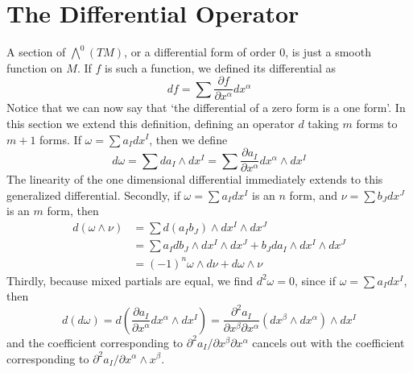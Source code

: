 \section{The Differential Operator}

A section of $\bigwedge^0(TM)$, or a differential form of order 0, is just a smooth function on $M$. If $f$ is such a function, we defined its differential as
%
\[ df = \sum \frac{\partial f}{\partial x^\alpha} dx^\alpha \]
%
Notice that we can now say that `the differential of a zero form is a one form'. In this section we extend this definition, defining an operator $d$ taking $m$ forms to $m+1$ forms. If $\omega = \sum a_I dx^I$, then we define
%
\[ d\omega = \sum da_I \wedge dx^I = \sum \frac{\partial a_I}{\partial x^\alpha} dx^\alpha \wedge dx^I \]
%
The linearity of the one dimensional differential immediately extends to this generalized differential. Secondly, if $\omega = \sum a_I dx^I$ is an $n$ form, and $\nu = \sum b_J dx^J$ is an $m$ form, then
%
\begin{align*}
    d(\omega \wedge \nu) &= \sum d(a_Ib_J) \wedge dx^I \wedge dx^J\\
    &= \sum a_I db_J \wedge dx^I \wedge dx^J + b_J da_I \wedge dx^I \wedge dx^J\\
    &= (-1)^n \omega \wedge d\nu + d\omega \wedge \nu
\end{align*}
%
Thirdly, because mixed partials are equal, we find $d^2 \omega = 0$, since if $\omega = \sum a_I dx^I$, then
%
\[ d(d\omega) = d \left( \frac{\partial a_I}{\partial x^\alpha} dx^\alpha \wedge dx^I \right) = \frac{\partial^2 a_I}{\partial x^\beta \partial x^\alpha} (dx^\beta \wedge dx^\alpha) \wedge dx^I \]
%
and the coefficient corresponding to $\partial^2 a_I/\partial x^\beta \partial x^\alpha$ cancels out with the coefficient corresponding to $\partial^2 a_I/\partial x^\alpha \wedge x^\beta$.

